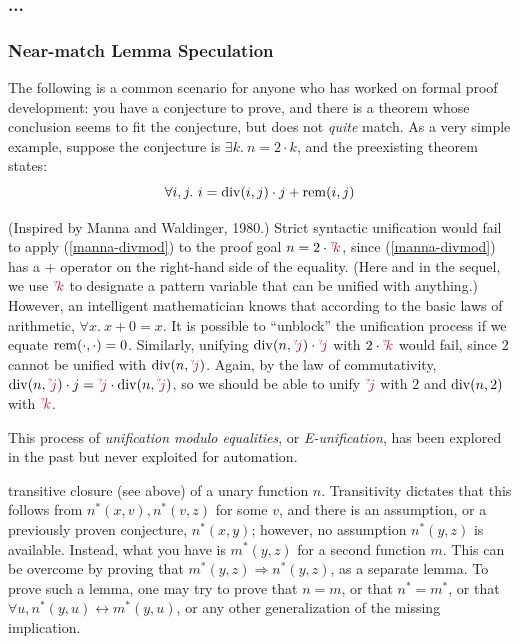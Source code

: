 \subsubsection{...}

\subsubsection{Near-match Lemma Speculation}

The following is a common scenario for anyone who has worked on formal proof development:
you have a conjecture to prove, and there is
a theorem whose conclusion seems to fit the conjecture, but does not \emph{quite} match.
As a very simple example, suppose the conjecture is
$\exists k.~ n = 2\cdot k$, and the preexisting theorem states:
\begin{equation}\label{manna-divmod}
  \forall i, j.~ i = \mathrm{div}(i, j) \cdot j + \mathrm{rem}(i, j)
\end{equation}

(Inspired by Manna and Waldinger, 1980.)
Strict syntactic unification would fail to apply (\ref{manna-divmod}) to the proof goal $n = 2\cdot {\color{purple}^{\scriptscriptstyle?}\!{k}}$, since (\ref{manna-divmod}) has a $+$ operator on the right-hand side of the equality.
(Here and in the sequel, we use ${\color{purple}^{\scriptscriptstyle?}\!{k}}$ to designate a pattern variable that can be unified with anything.)
However, an intelligent mathematician knows that according to the basic laws of arithmetic, $\forall x.~x + 0 = x$.
It is possible to ``unblock'' the unification process if we equate $\mathrm{rem}(\cdot,\cdot) = 0$.
Similarly, unifying $\mathrm{div}(n,{\color{purple}^{\scriptscriptstyle?}\!{j}})\cdot {\color{purple}^{\scriptscriptstyle?}\!{j}}$ with $2\cdot {\color{purple}^{\scriptscriptstyle?}\!{k}}$ would fail, since $2$ cannot be unified with $\mathrm{div}(n,{\color{purple}^{\scriptscriptstyle?}\!{j}})$.
Again, by the law of commutativity, 
$\mathrm{div}(n,{\color{purple}^{\scriptscriptstyle?}\!{j}})\cdot j = {\color{purple}^{\scriptscriptstyle?}\!{j}} \cdot\mathrm{div}(n,{\color{purple}^{\scriptscriptstyle?}\!{j}})$,
so we should be able to unify ${\color{purple}^{\scriptscriptstyle?}\!{j}}$ with $2$ and $\mathrm{div}(n, 2)$ with ${\color{purple}^{\scriptscriptstyle?}\!{k}}$.

This process of \emph{unification modulo equalities}, or \emph{E-unification}, has been explored in the past but never exploited for automation\citeneeded.

{\color{gray}
transitive closure (see above) of a unary function $n$.
Transitivity dictates that this follows from $n^*(x,v), n^*(v,z)$ for some $v$,
and there is an assumption, or a previously proven conjecture, $n^*(x,y)$;
however, no assumption $n^*(y,z)$ is available.
Instead, what you have is $m^*(y,z)$ for a second function $m$.
This can be overcome by proving that $m^*(y,z) \Rightarrow n^*(y,z)$, as a
separate lemma.
To prove such a lemma, one may try to prove that $n=m$, or that $n^*=m^*$,
or that $\forall u, n^*(y,u)\leftrightarrow m^*(y,u)$, or any other generalization
of the missing implication.}

